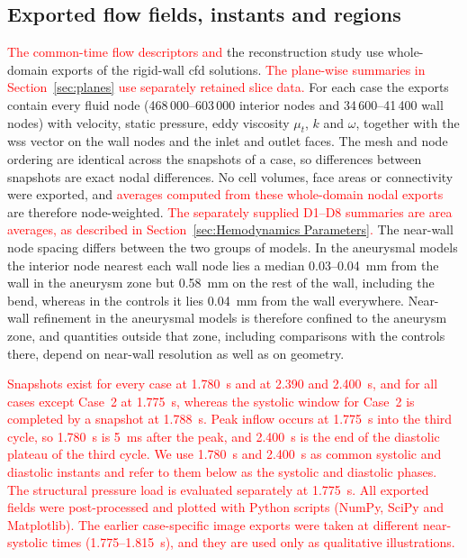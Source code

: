 \documentclass[12pt,a4paper]{article}
\newcommand{\cfdrevision}[1]{\textcolor{red}{#1}}
\newcommand{\CFD}{\ac{cfd}\xspace}
\newcommand{\WSS}{\ac{wss}\xspace}
\theoremstyle{definition}
\numberwithin{equation}{section}
\newcommand{\revision}[1]{\textcolor{red}{#1}}
\begin{document}
\subsection{Exported flow fields, instants and regions}
\label{sec:exports}
  \revision{The common-time flow descriptors and } the reconstruction study  use whole-domain exports of the rigid-wall \CFD solutions.  \revision{The plane-wise summaries in Section~\ref{sec:planes} use separately retained slice data. } For each case the exports contain every fluid node (468\,000--603\,000 interior nodes and 34\,600--41\,400 wall nodes) with velocity, static pressure, eddy viscosity $\mu_t$, $k$ and $\omega$, together with the \WSS vector on the wall nodes and the inlet and outlet faces. The mesh and node ordering are identical across the snapshots of a case, so differences between snapshots are exact nodal differences. No cell volumes, face areas or connectivity were exported, and   \revision{\cfdrevision{averages computed from these whole-domain nodal exports} } are therefore node-weighted.  \revision{\cfdrevision{The separately supplied D1--D8 summaries are area averages, as described in Section~\ref{sec:Hemodynamics Parameters}.} } The near-wall node spacing differs between the two groups of models. In the aneurysmal models the interior node nearest each wall node lies a median 0.03--0.04~mm from the wall in the aneurysm zone but 0.58~mm on the rest of the wall, including the bend, whereas in the controls it lies 0.04~mm from the wall everywhere. Near-wall refinement in the aneurysmal models is therefore confined to the aneurysm zone, and quantities outside that zone, including comparisons with the controls there, depend on near-wall resolution as well as on geometry.

\revision{Snapshots exist for every case at 1.780~s and at 2.390 and 2.400~s, and for all cases except Case~2 at 1.775~s, whereas the systolic window for Case~2 is completed by a snapshot at 1.788~s. Peak inflow occurs at 1.775~s into the third cycle, so 1.780~s is 5~ms after the peak, and 2.400~s is the end of the diastolic plateau of the third cycle. We use 1.780~s and 2.400~s as common systolic and diastolic instants and refer to them below as the systolic and diastolic phases. The structural pressure load is evaluated separately at 1.775~s. All exported fields were post-processed and plotted with Python scripts (NumPy, SciPy and Matplotlib). The earlier case-specific image exports were taken at different near-systolic times (1.775--1.815~s), and they are used only as qualitative illustrations.}
\end{document}
